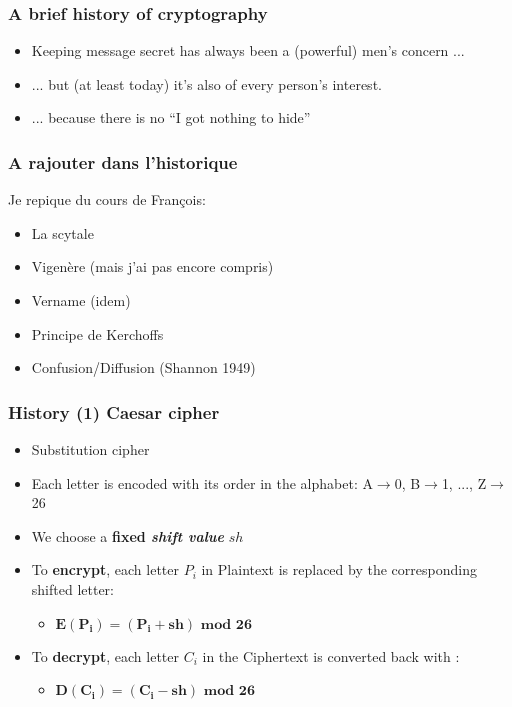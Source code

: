 \documentclass[
hyperref={pdfpagelabels=false}
,xcolor=table
]
{beamer}
\begin{document}
\begin{frame}
  \frametitle{A brief history of cryptography}

  \begin{itemize}
  \item Keeping message secret has always been a (powerful) men's
    concern ...
  \item  ... but (at least today) it's also of every person's interest. 
  \item ... because there is no ``I got nothing to hide'' 
  \end{itemize}
\end{frame}


\begin{frame}
  \frametitle{A rajouter dans l'historique}

  Je repique du cours de François:
  \begin{itemize}
  \item La scytale
  \item Vigenère (mais j'ai pas encore compris)
  \item Vername (idem)
  \item Principe de Kerchoffs
  \item Confusion/Diffusion (Shannon 1949)
  \end{itemize}
  
\end{frame}


\begin{frame}
  \frametitle{History (1) Caesar cipher}

  \begin{itemize}
  \item Substitution cipher
  \item Each letter is encoded with its order in the alphabet: A$\rightarrow$0, B$\rightarrow$1, ..., Z$\rightarrow$26
  \item We choose a \textbf{fixed \textit{shift value}} $sh$
  \item To \textbf{encrypt}, each letter $P_i$ in Plaintext is replaced by the corresponding shifted letter:
    \begin{itemize}
    \item[] $\bm{E(P_i) = (P_i + sh) \mbox{ mod } 26}$
    \end{itemize}
  \item To \textbf{decrypt}, each letter $C_i$ in the Ciphertext is converted back with :
    \begin{itemize}
    \item[] $\bm{D(C_i) = (C_i - sh) \mbox{ mod } 26}$ 
    \end{itemize}
  \end{itemize}

  
\end{frame}
\end{document}
